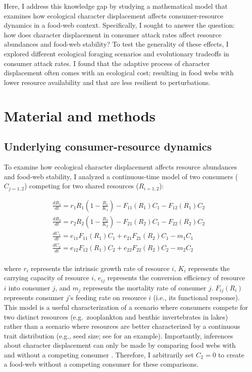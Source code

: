 \documentclass[11pt,]{article}
\begin{document}
Here, I address this knowledge gap by studying a mathematical model that
examines how ecological character displacement affects consumer-resource
dynamics in a food-web context. Specifically, I sought to answer the
question: how does character displacement in consumer attack rates
affect resource abundances and food-web stability? To test the
generality of these effects, I explored different ecological foraging
scenarios and evolutionary tradeoffs in consumer attack rates. I found
that the adaptive process of character displacement often comes with an
ecological cost; resulting in food webs with lower resource availability
and that are less resilient to perturbations.

\section{Material and methods}\label{material-and-methods}

\subsection{Underlying consumer-resource
dynamics}\label{underlying-consumer-resource-dynamics}

To examine how ecological character displacement affects resource
abundances and food-web stability, I analyzed a continuous-time model of
two consumers (\(C_{j=1,2}\)) competing for two shared resources
(\(R_{i=1,2}\)):

\begin{equation} \label{eq:1}
  \begin{split}
     & \frac{dR_1}{dt}=r_1R_1(1-\frac{R_1}{K_1})-F_{11}(R_1)C_1-F_{12}(R_1)C_2 \\
     & \frac{dR_2}{dt}=r_2R_2(1-\frac{R_2}{K_2})-F_{21}(R_2)C_1-F_{22}(R_2)C_2 \\
     & \frac{dC_1}{dt}=e_{11}F_{11}(R_1)C_1+e_{21}F_{21}(R_2)C_1-m_1C_1 \\
     & \frac{dC_2}{dt}=e_{12}F_{12}(R_1)C_2+e_{22}F_{22}(R_2)C_2-m_2C_2 \\
  \end{split}
\end{equation}

where \(r_i\) represents the intrinsic growth rate of resource \(i\),
\(K_i\) represents the carrying capacity of resource \(i\), \(e_{ij}\)
represents the conversion efficiency of resource \(i\) into consumer
\(j\), and \(m_j\) represents the mortality rate of consumer \(j\).
\(F_{ij}(R_i)\) represents consumer \(j\)'s feeding rate on resource
\(i\) (i.e., its functional response). This model is a useful
characterization of a scenario where consumers compete for two distinct
resources (e.g.~zooplankton and benthic invertebrates in lakes) rather
than a scenario where resources are better characterized by a continuous
trait distribution (e.g., seed size; see \citet{Taper1985} for an
example). Importantly, inferences about character displacement can only
be made by comparing food webs with and without a competing consumer
\citep{Schluter1992}. Therefore, I arbitrarily set \(C_2=0\) to create a
food-web without a competing consumer for these comparisons.
\end{document}
